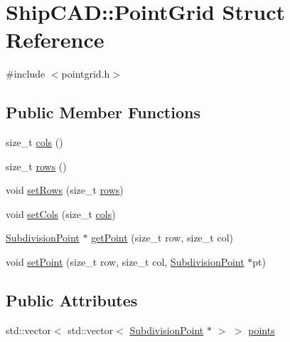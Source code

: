 \hypertarget{structShipCAD_1_1PointGrid}{}\section{Ship\+C\+AD\+:\+:Point\+Grid Struct Reference}
\label{structShipCAD_1_1PointGrid}


{\ttfamily \#include $<$pointgrid.\+h$>$}

\subsection*{Public Member Functions}
\begin{DoxyCompactItemize}
\item 
size\+\_\+t \hyperlink{structShipCAD_1_1PointGrid_a7c4b8397c5a6dfcb88f91412bc1ea5e2}{cols} ()
\item 
size\+\_\+t \hyperlink{structShipCAD_1_1PointGrid_a2bd6eecd15643afb29bd7de2f891b614}{rows} ()
\item 
void \hyperlink{structShipCAD_1_1PointGrid_a6f0b92dc55d7df73c25fbf10552c8f4a}{set\+Rows} (size\+\_\+t \hyperlink{structShipCAD_1_1PointGrid_a2bd6eecd15643afb29bd7de2f891b614}{rows})
\item 
void \hyperlink{structShipCAD_1_1PointGrid_a3f8dccba61161a2baf323e2a2961e132}{set\+Cols} (size\+\_\+t \hyperlink{structShipCAD_1_1PointGrid_a7c4b8397c5a6dfcb88f91412bc1ea5e2}{cols})
\item 
\hyperlink{classShipCAD_1_1SubdivisionPoint}{Subdivision\+Point} $\ast$ \hyperlink{structShipCAD_1_1PointGrid_ac550e1688340f55d1dae9ec8c370ee31}{get\+Point} (size\+\_\+t row, size\+\_\+t col)
\item 
void \hyperlink{structShipCAD_1_1PointGrid_aa2c44687569cebc64f33a7840ea5c1b0}{set\+Point} (size\+\_\+t row, size\+\_\+t col, \hyperlink{classShipCAD_1_1SubdivisionPoint}{Subdivision\+Point} $\ast$pt)
\end{DoxyCompactItemize}
\subsection*{Public Attributes}
\begin{DoxyCompactItemize}
\item 
std\+::vector$<$ std\+::vector$<$ \hyperlink{classShipCAD_1_1SubdivisionPoint}{Subdivision\+Point} $\ast$ $>$ $>$ \hyperlink{structShipCAD_1_1PointGrid_acb874cfa2bdda20e8a996e0e1a153feb}{points}
\end{DoxyCompactItemize}


